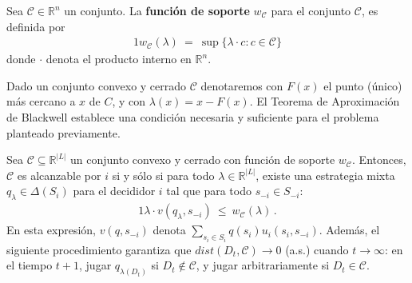 \begin{definition}
\label{def:funcion-soporte}
Sea $\mathcal{C} \in \mathbb{R}^n$ un conjunto. La \textbf{función de soporte} $w_{\mathcal{C}}$ para el conjunto $\mathcal{C}$, es definida por
\begin{alignat}{1}
	w_{\mathcal{C}}(\lambda)\ =\ \sup\{\lambda \cdot c : c \in \mathcal{C} \}
\end{alignat}
donde $\cdot$ denota el producto interno en $\mathbb{R}^n$.
\end{definition}

Dado un conjunto convexo y cerrado $\mathcal{C}$ denotaremos con $F(x)$ el punto (único) más cercano a $x$ de $C$, y con $\lambda(x)= x - F(x)$.
El Teorema de Aproximación de Blackwell establece una condición necesaria y suficiente para el problema planteado previamente.

\begin{theorem}
\label{theo:blackwell}
Sea $\mathcal{C} \subseteq \mathbb{R}^{|L|}$ un conjunto convexo y cerrado con función de soporte $w_{\mathcal{C}}$. Entonces, $\mathcal{C}$ es alcanzable por $i$ si y sólo si para todo $\lambda \in \mathbb{R}^{|L|}$, existe una estrategia mixta $q_{\lambda} \in \Delta(S_i)$ para el decididor $i$ tal que para todo $s_{-i}\in S_{-i}$:
\begin{alignat}{1}
  \lambda \cdot v(q_{\lambda}, s_{-i})\ \leq\ w_{\mathcal{C}}(\lambda) \,.
\end{alignat}
En esta expresión, $v(q, s_{-i})$ denota $\sum_{s_i \in S_i} q(s_i)u_i(s_i, s_{-i})$. 
Además, el siguiente procedimiento garantiza que $dist(D_t, \mathcal{C}) \rightarrow 0$ (a.s.) cuando $t \rightarrow \infty$: en el tiempo $t+1$, jugar $q_{\lambda(D_t)}$ si $D_t \notin \mathcal{C}$, y jugar arbitrariamente si $D_t \in \mathcal{C}$.
\end{theorem}

